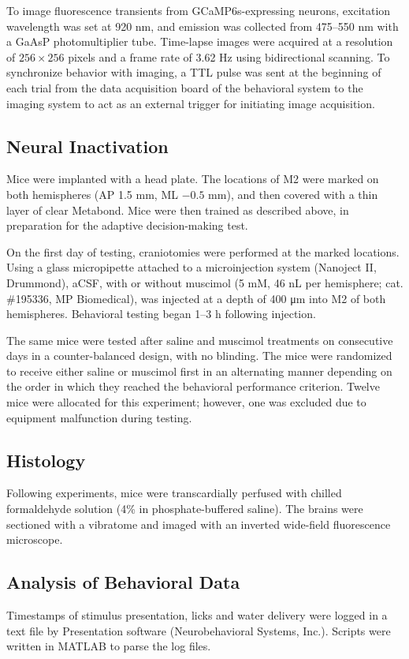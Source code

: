To image fluorescence transients from GCaMP6s-expressing neurons, excitation wavelength was set at 920 nm, and emission was collected from 475--550 nm with a GaAsP photomultiplier tube. Time-lapse images were acquired at a resolution of $256 \times 256$ pixels and a frame rate of 3.62 Hz using bidirectional scanning. To synchronize behavior with imaging, a TTL pulse was sent at the beginning of each trial from the data acquisition board of the behavioral system to the imaging system to act as an external trigger for initiating image acquisition.

\subsection*{Neural Inactivation}
Mice were implanted with a head plate. The locations of M2 were marked on both hemispheres (AP 1.5 mm, ML $-0.5$ mm), and then covered with a thin layer of clear Metabond. Mice were then trained as described above, in preparation for the adaptive decision-making test. 

On the first day of testing, craniotomies were performed at the marked locations. Using a glass micropipette attached to a microinjection system (Nanoject II, Drummond), aCSF, with or without muscimol (5 mM, 46 nL per hemisphere; cat. \#195336, MP Biomedical), was injected at a depth of 400 \si{\um} into M2 of both hemispheres. Behavioral testing began 1--3 h following injection. 

The same mice were tested after saline and muscimol treatments on consecutive days in a counter-balanced design, with no blinding. The mice were randomized to receive either saline or muscimol first in an alternating manner depending on the order in which they reached the behavioral performance criterion. Twelve mice were allocated for this experiment; however, one was excluded due to equipment malfunction during testing.

\subsection*{Histology}
Following experiments, mice were transcardially perfused with chilled formaldehyde solution (4\% in phosphate-buffered saline). The brains were sectioned with a vibratome and imaged with an inverted wide-field fluorescence microscope.

\subsection*{Analysis of Behavioral Data}
Timestamps of stimulus presentation, licks and water delivery were logged in a text file by Presentation software (Neurobehavioral Systems, Inc.). Scripts were written in MATLAB to parse the log files. 

